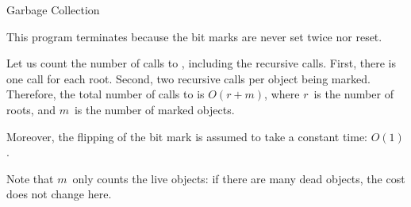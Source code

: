 \documentclass[compress,dvipdfmx]{beamer}
\begin{document}
%
\begin{frame}{Garbage Collection}

  This program terminates because the bit marks are never set twice
  nor reset.

  \bigskip

  Let us count the number of calls to , including the
  recursive calls. First, there is one call for each root. Second, two
  recursive calls per object being marked. Therefore, the total number
  of calls to  is \(O(r + m)\), where \(r\)~is the number of
  roots, and \(m\)~is the number of marked objects.

  \bigskip

  Moreover, the flipping of the bit mark is assumed to take a constant
  time: \(O(1)\).

  \bigskip

  Note that \(m\)~only counts the live objects: if there are many dead
  objects, the cost does not change here.

\end{frame}








\end{document}
